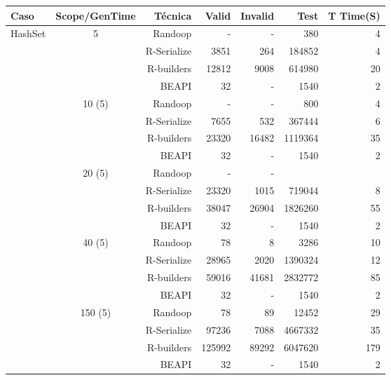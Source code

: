 \begin{table}[H]
\scriptsize
\centering
\label{tab:results-obj1}
\begin{tabular}{ l c  r  |r | r | r|r  }
  \toprule
  \textbf{Caso} & \textbf{Scope/GenTime} & \textbf{Técnica} & \textbf{Valid}  & \textbf{Invalid} & \textbf{Test}&\textbf{T Time(S)}  \\
  \midrule
  HashSet		&	5	&	Randoop	&	-	&	- & 380&4	\\
&		&	R-Serialize	&	3851	&	264 & 184852&4	\\
&		&	R-builders	&	12812	&	9008 & 614980&20	\\
&		&	BEAPI	&	32	&	- & 1540&2	\\
\cline{2-7}
		&	10 (5)	&	Randoop	&	-	&	-&800&4\\
&		&	R-Serialize	&	7655	&	532 &367444&6	\\
&		&	R-builders	&	23320	&	16482 &1119364&35	\\
&		&	BEAPI	&	32	&	- &1540&2\\
\cline{2-7}
		&	20 (5)	&	Randoop	&	-&-&\\
&		&	R-Serialize	&	23320	&	1015 &719044&8	\\
&		&	R-builders	&	38047	&	26904 &1826260&55	\\
&		&	BEAPI	&	32	&	- &1540&2\\
\cline{2-7}
		&	40 (5)	&	Randoop	&	78	&	8&3286&10\\
&		&	R-Serialize	&	28965	&	2020 &1390324&12	\\
&		&	R-builders	&	59016	&	41681 &2832772&85\\
&		&	BEAPI	&	32	&	-&1540&2 \\
\cline{2-7}
		&	150 (5)	&	Randoop	&	78	&	89&12452&29\\
&		&	R-Serialize	&	97236	&	7088 &4667332&35	\\
&		&	R-builders	&	125992	&	89292 &6047620&179	\\
&		&	BEAPI	&	32	&	- &1540&2\\\end{tabular}
\end{table}

